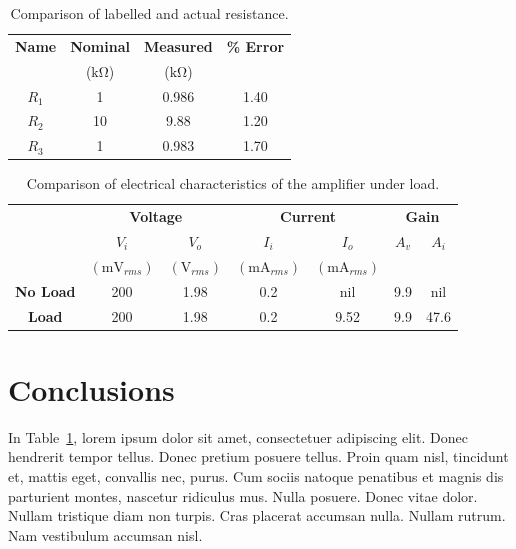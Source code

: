 \documentclass{article}
\begin{document}
\begin{table}[h]
  \label{tab:table_01}
  \centering
  \begin{tabular}{*{4}{c}}
    \textbf{Name} & \textbf{Nominal} & \textbf{Measured} & \textbf{\% Error} \\
    & ($\si{\kilo\ohm}$) & ($\si{\kilo\ohm}$) & \\
    \hline
    $R_1$ & 1 & 0.986 & 1.40 \\
    $R_2$ & 10 & 9.88 & 1.20 \\
    $R_3$ & 1 & 0.983 & 1.70 \\
  \end{tabular}
  \caption{Comparison of labelled and actual resistance.}
\end{table}

\begin{table}[h]
  \label{tab:table_02}
  \centering
  \begin{tabular}{*{7}{c}}
    & \multicolumn{2}{c}{\textbf{Voltage}} & \multicolumn{2}{c}{\textbf{Current}} & \multicolumn{2}{c}{\textbf{Gain}} \\
    & $V_i$ & $V_o$ & $I_i$ & $I_o$ & $A_v$ & $A_i$ \\
    & $(\si{\milli\volt_{rms}})$ & $(\si{\volt_{rms}})$ & $(\si{\milli\ampere_{rms}})$ & $(\si{\milli\ampere_{rms}})$ & & \\
    \hline
    \textbf{No Load} & 200 & 1.98 & 0.2 & nil & 9.9 & nil \\
    \textbf{Load} & 200 & 1.98 & 0.2 & 9.52 & 9.9 & 47.6 \\
  \end{tabular}
  \caption{Comparison of electrical characteristics of the amplifier under load.}
\end{table}

\section{Conclusions}
\label{sec:conclusion}

In Table~\ref{tab:table_01}, lorem ipsum dolor sit amet, consectetuer
adipiscing elit. Donec hendrerit tempor tellus. Donec pretium posuere
tellus. Proin quam nisl, tincidunt et, mattis eget, convallis nec,
purus. Cum sociis natoque penatibus et magnis dis parturient montes,
nascetur ridiculus mus. Nulla posuere. Donec vitae dolor. Nullam
tristique diam non turpis. Cras placerat accumsan nulla. Nullam
rutrum. Nam vestibulum accumsan nisl.
\end{document}
